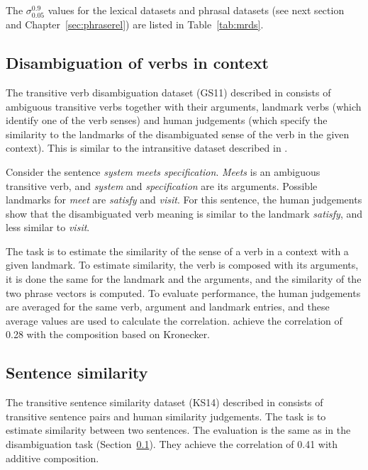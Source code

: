 The $\sigma^{0.9}_{0.05}$ values for the lexical datasets and phrasal datasets (see next section and Chapter~\ref{sec:phraserel}) are listed in Table~\ref{tab:mrds}.

\subsection{Disambiguation of verbs in context}
\label{sec:disamb}

The transitive verb disambiguation dataset (GS11)
described in \citet{Grefenstette:2011:ETV:2140490.2140497,Grefenstette:2011:ESC:2145432.2145580} consists of ambiguous transitive verbs together with their arguments, landmark verbs (which identify one of the verb senses) and human judgements (which specify the similarity to the landmarks of the disambiguated sense of the verb in the given context). This is similar to the intransitive dataset described in .

Consider the sentence \textit{system meets specification}. \textit{Meets} is an ambiguous transitive verb, and \textit{system}
and \textit{specification} are its arguments. Possible landmarks for \emph{meet} are \textit{satisfy} and \textit{visit}. For this sentence, the human judgements show that the disambiguated verb meaning is similar to the landmark \textit{satisfy}, and less similar to \textit{visit}.

The task is to estimate the similarity of the sense of a verb in a context with a given landmark. To estimate similarity, the verb is composed with its arguments, it is done the same for the landmark and the arguments, and the similarity of the two phrase vectors is computed. To evaluate performance, the human judgements are averaged for the same verb, argument and landmark entries, and these average values are used to calculate the correlation. \citet{Grefenstette:2011:ETV:2140490.2140497} achieve the correlation of 0.28 with the composition based on Kronecker.

\subsection{Sentence similarity}
\label{sec:sentence-similarity}

The transitive sentence similarity dataset (KS14) described in  consists of transitive sentence pairs and human similarity judgements. The task is to estimate similarity between two sentences. The evaluation is the same as in the disambiguation task (Section~\ref{sec:disamb}). They achieve the correlation of 0.41 with additive composition.

